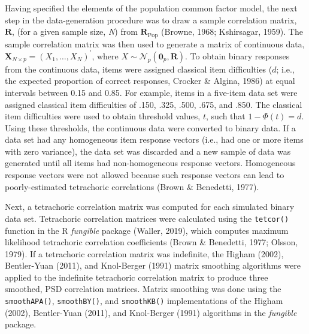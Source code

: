 \documentclass[
  english,
  man]{apa6}
\begin{document}
Having specified the elements of the population common factor model, the next step in the data-generation procedure was to draw a sample correlation matrix, \(\mathbf{R}\), (for a given sample size, \emph{N}) from \(\mathbf{R}_{\textrm{Pop}}\) (Browne, 1968; Kshirsagar, 1959). The sample correlation matrix was then used to generate a matrix of continuous data, \(\mathbf{X}_{N \times p} = (X_1, \dots, X_N)^\prime\), where \(X \sim \mathcal{N}_p(\mathbf{0}_p, \mathbf{R})\). To obtain binary responses from the continuous data, items were assigned classical item difficulties (\(d\); i.e., the expected proportion of correct responses, Crocker \& Algina, 1986) at equal intervals between 0.15 and 0.85. For example, items in a five-item data set were assigned classical item difficulties of .150, .325, .500, .675, and .850. The classical item difficulties were used to obtain threshold values, \(t\), such that \(1 - \Phi(t) = d\). Using these thresholds, the continuous data were converted to binary data. If a data set had any homogeneous item response vectors (i.e., had one or more items with zero variance), the data set was discarded and a new sample of data was generated until all items had non-homogeneous response vectors. Homogeneous response vectors were not allowed because such response vectors can lead to poorly-estimated tetrachoric correlations (Brown \& Benedetti, 1977).

Next, a tetrachoric correlation matrix was computed for each simulated binary data set. Tetrachoric correlation matrices were calculated using the \texttt{tetcor()} function in the R \emph{fungible} package (Waller, 2019), which computes maximum likelihood tetrachoric correlation coefficients (Brown \& Benedetti, 1977; Olsson, 1979). If a tetrachoric correlation matrix was indefinite, the Higham (2002), Bentler-Yuan (2011), and Knol-Berger (1991) matrix smoothing algorithms were applied to the indefinite tetrachoric correlation matrix to produce three smoothed, PSD correlation matrices. Matrix smoothing was done using the \texttt{smoothAPA()}, \texttt{smoothBY()}, and \texttt{smoothKB()} implementations of the Higham (2002), Bentler-Yuan (2011), and Knol-Berger (1991) algorithms in the \emph{fungible} package.
\end{document}

